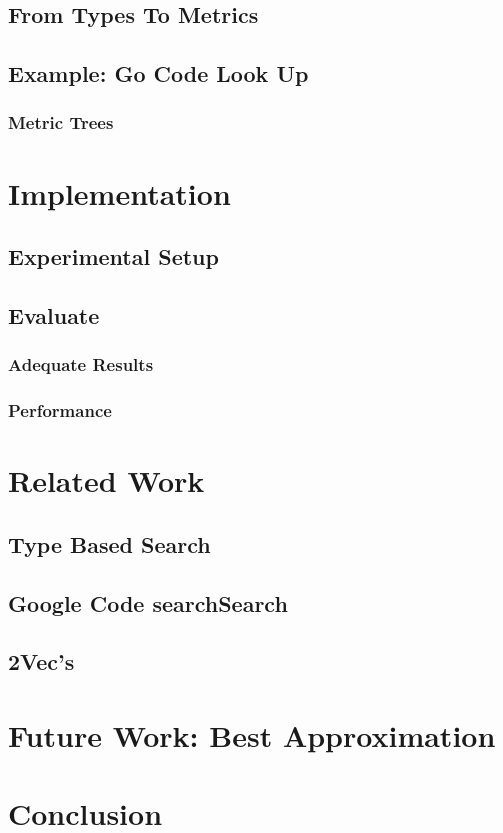 \documentclass[12pt]{article}
\theoremstyle{plain}
\begin{document}
\subsection{From Types To Metrics}

\subsection{Example: Go Code Look Up}

\subsubsection{Metric Trees}

\section{Implementation}

\subsection{Experimental Setup}

\subsection{Evaluate}
\subsubsection{Adequate Results}

\subsubsection{Performance}

\section{Related Work}
\subsection{Type Based Search}

\subsection{Google Code searchSearch}

\subsection{2Vec's}

\section{Future Work: Best Approximation}

\section{Conclusion}



\end{document}
